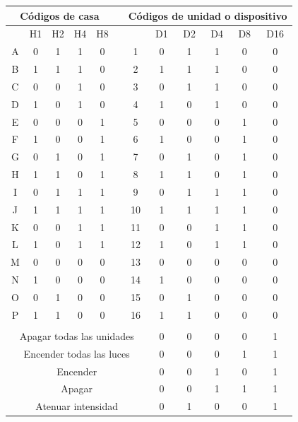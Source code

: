 \begin{table}[htbp]
\centering
\begin{tabular}{cccccccccccc}
\toprule
\multicolumn{5}{c}{Códigos de casa} &  &\multicolumn{6}{c}{Códigos de unidad o dispositivo}\\ \toprule
  & H1 & H2 & H4 & H8 &    &    & D1 & D2 & D4 & D8 & D16\\ \midrule
A & 0  & 1  & 1  & 0  &    & 1  & 0  & 1  & 1  & 0  & 0\\
B & 1  & 1  & 1  & 0  &    & 2  & 1  & 1  & 1  & 0  & 0\\
C & 0  & 0  & 1  & 0  &    & 3  & 0  & 1  & 1  & 0  & 0\\
D & 1  & 0  & 1  & 0  &    & 4  & 1  & 0  & 1  & 0  & 0\\
E & 0  & 0  & 0  & 1  &    & 5  & 0  & 0  & 0  & 1  & 0\\
F & 1  & 0  & 0  & 1  &    & 6  & 1  & 0  & 0  & 1  & 0\\
G & 0  & 1  & 0  & 1  &    & 7  & 0  & 1  & 0  & 1  & 0\\
H & 1  & 1  & 0  & 1  &    & 8  & 1  & 1  & 0  & 1  & 0\\
I & 0  & 1  & 1  & 1  &    & 9  & 0  & 1  & 1  & 1  & 0\\
J & 1  & 1  & 1  & 1  &    & 10 & 1  & 1  & 1  & 1  & 0\\
K & 0  & 0  & 1  & 1  &    & 11 & 0  & 0  & 1  & 1  & 0\\
L & 1  & 0  & 1  & 1  &    & 12 & 1  & 0  & 1  & 1  & 0\\
M & 0  & 0  & 0  & 0  &    & 13 & 0  & 0  & 0  & 0  & 0\\
N & 1  & 0  & 0  & 0  &    & 14 & 1  & 0  & 0  & 0  & 0\\
O & 0  & 1  & 0  & 0  &    & 15 & 0  & 1  & 0  & 0  & 0\\
P & 1  & 1  & 0  & 0  &    & 16 & 1  & 1  & 0  & 0  & 0\\ \bottomrule \addlinespace
\multicolumn{12}{c}{Funciones}\\ \midrule
\multicolumn{7}{c}{Apagar todas las unidades} & 0 & 0 & 0 & 0 & 1 \\
\multicolumn{7}{c}{Encender todas las luces}  & 0 & 0 & 0 & 1 & 1 \\
\multicolumn{7}{c}{Encender}                  & 0 & 0 & 1 & 0 & 1 \\
\multicolumn{7}{c}{Apagar}                    & 0 & 0 & 1 & 1 & 1 \\
\multicolumn{7}{c}{Atenuar intensidad}        & 0 & 1 & 0 & 0 & 1 \\

\end{tabular}
\end{table}
